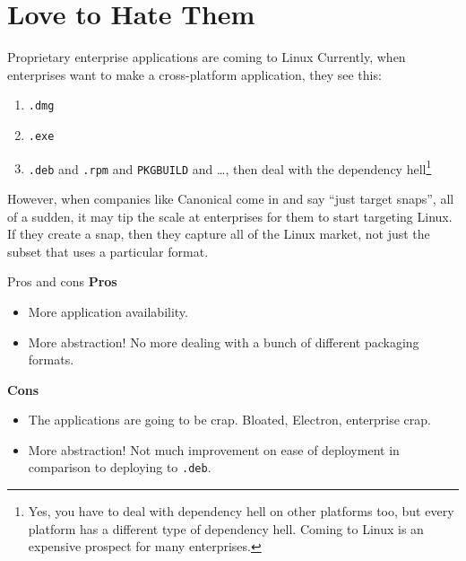\documentclass{lug}
\begin{document}
\section{Love to Hate Them}

\begin{frame}{Proprietary enterprise applications are coming to Linux}
    Currently, when enterprises want to make a cross-platform application, they
    see this:
    \begin{enumerate}[leftmargin=2cm]
        \item[macOS] \texttt{.dmg}
        \item[Windows] \texttt{.exe}
        \item[Linux] \texttt{.deb} and \texttt{.rpm} and \texttt{PKGBUILD} and
            \dots, then deal with the dependency hell\footnote[frame]{Yes, you
            have to deal with dependency hell on other platforms too, but every
            platform has a different type of dependency hell. Coming to Linux is
            an expensive prospect for many enterprises.}
    \end{enumerate}

    However, when companies like Canonical come in and say ``just target
    snaps'', all of a sudden, it may tip the scale at enterprises for them to
    start targeting Linux. If they create a snap, then they capture all of the
    Linux market, not just the subset that uses a particular format.
\end{frame}

\begin{frame}{Pros and cons}
    \textbf{Pros}
    \begin{itemize}
        \item More application availability.
        \item More abstraction! No more dealing with a bunch of different
            packaging formats.
    \end{itemize}

    \textbf{Cons}
    \begin{itemize}
        \item The applications are going to be crap. Bloated, Electron,
            enterprise crap.
        \item More abstraction! Not much improvement on ease of deployment in
            comparison to deploying to \texttt{.deb}.
    \end{itemize}
\end{frame}

\end{document}
